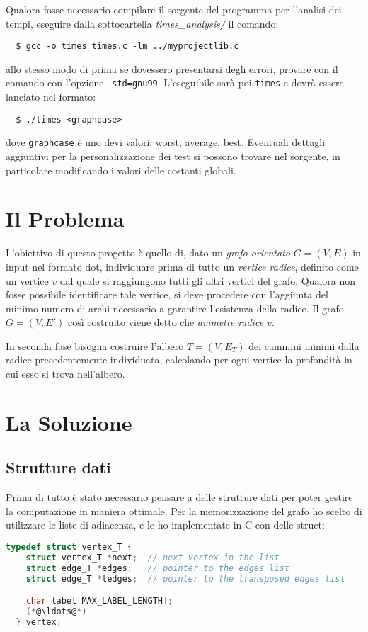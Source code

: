 \documentclass[a4paper,8pt]{article}
\theoremstyle{definition}
\theoremstyle{remark}
\begin{document}
Qualora fosse necessario compilare il sorgente del programma per l'analisi dei
tempi, eseguire dalla sottocartella \emph{times\_analysis/} il comando:
\begin{verbatim}
  $ gcc -o times times.c -lm ../myprojectlib.c
\end{verbatim}
allo stesso modo di prima se dovessero presentarsi degli errori, provare con il
comando con l'opzione \verb!-std=gnu99!. L'eseguibile sarà poi \verb!times!
e dovrà essere lanciato nel formato:
\begin{verbatim}
  $ ./times <graphcase>
\end{verbatim}
dove \verb!graphcase! è uno devi valori: worst, average, best. Eventuali dettagli
aggiuntivi per la personalizzazione dei test si possono trovare nel sorgente, in
particolare modificando i valori delle costanti globali.


\section{Il Problema}
L'obiettivo di questo progetto è quello di, dato un \emph{grafo orientato} $G=(V,E)$
in input nel formato dot, individuare prima di tutto un \emph{vertice radice},
definito come un vertice $v$ dal quale si raggiungono tutti gli altri vertici del grafo.
Qualora non fosse possibile identificare tale vertice, si deve procedere con
l'aggiunta del minimo numero di archi necessario a garantire l'esistenza della
radice. Il grafo $G=(V,E')$ così costruito viene detto che \emph{ammette radice $v$}.

In seconda fase bisogna costruire l'albero $T=(V,E_T)$ dei cammini minimi dalla
radice precedentemente individuata, calcolando per ogni vertice la profondità in
cui esso si trova nell'albero.


\section{La Soluzione}
\subsection{Strutture dati}
Prima di tutto è stato necessario pensare a delle strutture dati per poter gestire
la computazione in maniera ottimale. Per la memorizzazione del grafo ho scelto di
utilizzare le liste di adiacenza, e le ho implementate in C con delle struct:

\begin{lstlisting}[language=C]
  typedef struct vertex_T {
    struct vertex_T *next;  // next vertex in the list
    struct edge_T *edges;   // pointer to the edges list
    struct edge_T *tedges;  // pointer to the transposed edges list

    char label[MAX_LABEL_LENGTH];
    (*@\ldots@*)
  } vertex;
\end{lstlisting}
\end{document}
